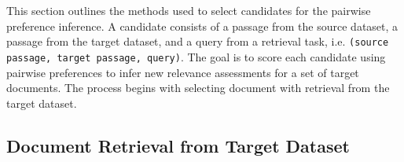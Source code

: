 This section outlines the methods used to select candidates for the pairwise preference inference. A candidate consists of a passage from the source dataset, a passage from the target dataset, and a query from a retrieval task, i.e. \texttt{(source passage, target passage, query)}. The goal is to score each candidate using pairwise preferences to infer new relevance assessments for a set of target documents. The process begins with selecting document with retrieval from the target dataset.

\subsection{Document Retrieval from Target Dataset}\label{document-retrieval-from-target-dataset}

